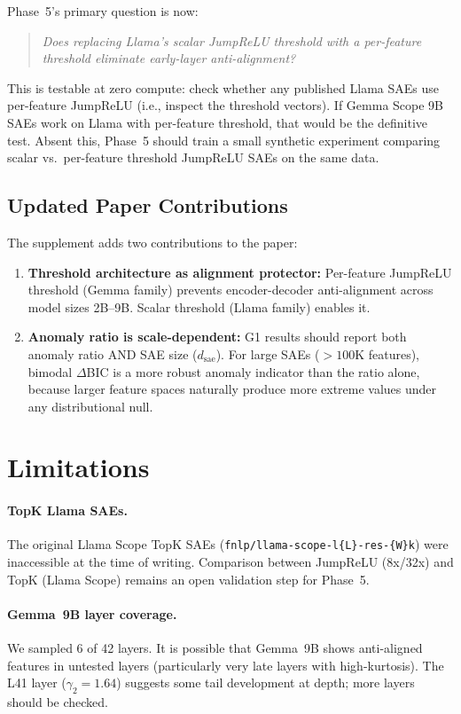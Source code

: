 \documentclass[11pt,a4paper]{article}
\begin{document}
Phase~5's primary question is now:
\begin{quote}
\emph{Does replacing Llama's scalar JumpReLU threshold with a per-feature threshold eliminate early-layer anti-alignment?}
\end{quote}
This is testable at zero compute: check whether any published Llama SAEs use per-feature JumpReLU (i.e., inspect the threshold vectors). If Gemma Scope 9B SAEs work on Llama with per-feature threshold, that would be the definitive test. Absent this, Phase~5 should train a small synthetic experiment comparing scalar vs.\ per-feature threshold JumpReLU SAEs on the same data.

\subsection{Updated Paper Contributions}

The supplement adds two contributions to the paper:
\begin{enumerate}
  \item \textbf{Threshold architecture as alignment protector:} Per-feature JumpReLU threshold (Gemma family) prevents encoder-decoder anti-alignment across model sizes 2B--9B. Scalar threshold (Llama family) enables it.
  \item \textbf{Anomaly ratio is scale-dependent:} G1 results should report both anomaly ratio AND SAE size ($d_\text{sae}$). For large SAEs ($>100$K features), bimodal $\Delta$BIC is a more robust anomaly indicator than the ratio alone, because larger feature spaces naturally produce more extreme values under any distributional null.
\end{enumerate}

\section{Limitations}

\paragraph{TopK Llama SAEs.} The original Llama Scope TopK SAEs (\texttt{fnlp/llama-scope-l\{L\}-res-\{W\}k}) were inaccessible at the time of writing. Comparison between JumpReLU (8x/32x) and TopK (Llama Scope) remains an open validation step for Phase~5.

\paragraph{Gemma~9B layer coverage.} We sampled 6 of 42 layers. It is possible that Gemma~9B shows anti-aligned features in untested layers (particularly very late layers with high-kurtosis). The L41 layer ($\gamma_2 = 1.64$) suggests some tail development at depth; more layers should be checked.
\end{document}
